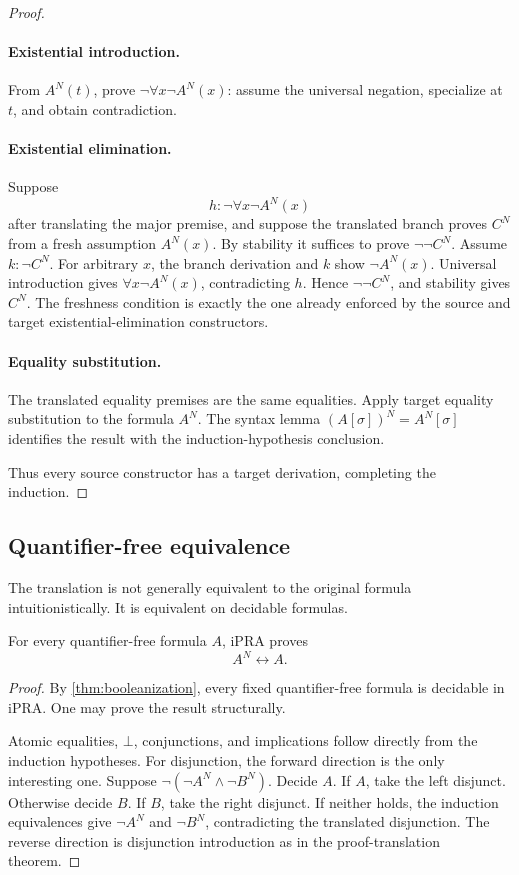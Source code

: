 \begin{proof}
\paragraph{Existential introduction.}
From \(A^N(t)\), prove \(\neg\forall x\neg A^N(x)\): assume the universal negation, specialize at \(t\), and obtain contradiction.

\paragraph{Existential elimination.}
Suppose
\[
 h:\neg\forall x\neg A^N(x)
\]
after translating the major premise, and suppose the translated branch proves \(C^N\) from a fresh assumption \(A^N(x)\).  By stability it suffices to prove \(\neg\neg C^N\).  Assume \(k:\neg C^N\).  For arbitrary \(x\), the branch derivation and \(k\) show \(\neg A^N(x)\).  Universal introduction gives \(\forall x\neg A^N(x)\), contradicting \(h\).  Hence \(\neg\neg C^N\), and stability gives \(C^N\).  The freshness condition is exactly the one already enforced by the source and target existential-elimination constructors.

\paragraph{Equality substitution.}
The translated equality premises are the same equalities.  Apply target equality substitution to the formula \(A^N\).  The syntax lemma
\((A[\sigma])^N=A^N[\sigma]\)
identifies the result with the induction-hypothesis conclusion.

Thus every source constructor has a target derivation, completing the induction.
\end{proof}

\subsection{Quantifier-free equivalence}

The translation is not generally equivalent to the original formula intuitionistically.  It is equivalent on decidable formulas.

\begin{theorem}
\label{thm:qf-recovery}
For every quantifier-free formula \(A\), iPRA proves
\[
  A^N\leftrightarrow A.
\]
\end{theorem}

\begin{proof}
By \cref{thm:booleanization}, every fixed quantifier-free formula is decidable in iPRA.  One may prove the result structurally.

Atomic equalities, \(\bot\), conjunctions, and implications follow directly from the induction hypotheses.  For disjunction, the forward direction is the only interesting one.  Suppose
\(\neg(\neg A^N\wedge\neg B^N)\).  Decide \(A\).  If \(A\), take the left disjunct.  Otherwise decide \(B\).  If \(B\), take the right disjunct.  If neither holds, the induction equivalences give \(\neg A^N\) and \(\neg B^N\), contradicting the translated disjunction.  The reverse direction is disjunction introduction as in the proof-translation theorem.
\end{proof}

